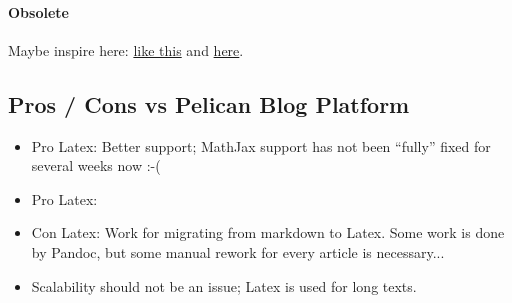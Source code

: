 \paragraph{Obsolete}

Maybe inspire here: \href{https://github.com/sanjayankur31/calliope/blob/master/calliope.sh}{like this} and \href{https://www.reddit.com/r/LaTeX/comments/2xysse/i_am_trying_to_make_a_research_diary_that/}{here}.


\subsection*{Pros / Cons vs Pelican Blog Platform}


\begin{itemize}

\item Pro Latex: Better support; MathJax support has not been ``fully'' fixed for several weeks now :-(

\item Pro Latex:

\item Con Latex: Work for migrating from markdown to Latex. Some work is done by Pandoc, but some manual rework for every article is necessary...

\item Scalability should not be an issue; Latex is used for long texts.

\end{itemize}
